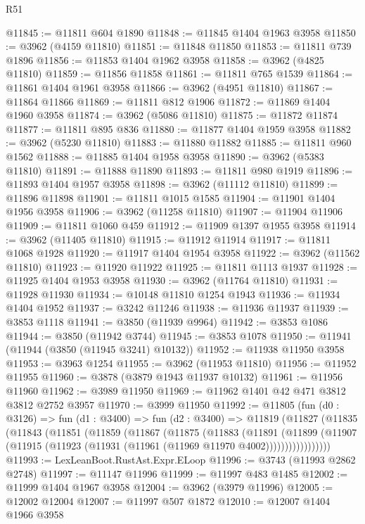 \begin{lexlean}{R51}
\begin{coremodule}
@11845 := @11811 @604 @1890
@11848 := @11845 @1404 @1963 @3958
@11850 := @3962 (@4159 @11810)
@11851 := @11848 @11850
@11853 := @11811 @739 @1896
@11856 := @11853 @1404 @1962 @3958
@11858 := @3962 (@4825 @11810)
@11859 := @11856 @11858
@11861 := @11811 @765 @1539
@11864 := @11861 @1404 @1961 @3958
@11866 := @3962 (@4951 @11810)
@11867 := @11864 @11866
@11869 := @11811 @812 @1906
@11872 := @11869 @1404 @1960 @3958
@11874 := @3962 (@5086 @11810)
@11875 := @11872 @11874
@11877 := @11811 @895 @836
@11880 := @11877 @1404 @1959 @3958
@11882 := @3962 (@5230 @11810)
@11883 := @11880 @11882
@11885 := @11811 @960 @1562
@11888 := @11885 @1404 @1958 @3958
@11890 := @3962 (@5383 @11810)
@11891 := @11888 @11890
@11893 := @11811 @980 @1919
@11896 := @11893 @1404 @1957 @3958
@11898 := @3962 (@11112 @11810)
@11899 := @11896 @11898
@11901 := @11811 @1015 @1585
@11904 := @11901 @1404 @1956 @3958
@11906 := @3962 (@11258 @11810)
@11907 := @11904 @11906
@11909 := @11811 @1060 @459
@11912 := @11909 @1397 @1955 @3958
@11914 := @3962 (@11405 @11810)
@11915 := @11912 @11914
@11917 := @11811 @1068 @1928
@11920 := @11917 @1404 @1954 @3958
@11922 := @3962 (@11562 @11810)
@11923 := @11920 @11922
@11925 := @11811 @1113 @1937
@11928 := @11925 @1404 @1953 @3958
@11930 := @3962 (@11764 @11810)
@11931 := @11928 @11930
@11934 := @10148 @11810 @1254 @1943
@11936 := @11934 @1404 @1952
@11937 := @3242 @11246
@11938 := @11936 @11937
@11939 := @3853 @1118
@11941 := @3850 (@11939 @9964)
@11942 := @3853 @1086
@11944 := @3850 (@11942 @3744)
@11945 := @3853 @1078
@11950 := @11941 (@11944 (@3850 (@11945 @3241) @10132))
@11952 := @11938 @11950 @3958
@11953 := @3963 @1254
@11955 := @3962 (@11953 @11810)
@11956 := @11952 @11955
@11960 := @3878 (@3879 @1943 @11937 @10132)
@11961 := @11956 @11960
@11962 := @3989 @11950
@11969 := @11962 @1401 @42 @471 @3812 @3812 @2752 @3957
@11970 := @3999 @11950
@11992 := @11805
    (fun (d0 : @3126) =>
    fun (d1 : @3400) =>
    fun (d2 : @3400) =>
    @11819
      (@11827
        (@11835
          (@11843
            (@11851
              (@11859
                (@11867
                  (@11875
                    (@11883
                      (@11891
                        (@11899
                          (@11907
                            (@11915 (@11923 (@11931 (@11961 (@11969 @11970 @4002)))))))))))))))))
@11993 := LexLeanBoot.RustAst.Expr.ELoop
@11996 := @3743 (@11993 @2862 @2748)
@11997 := @11147 @11996
@11999 := @11997 @483 @1485
@12002 := @11999 @1404 @1967 @3958
@12004 := @3962 (@3979 @11996)
@12005 := @12002 @12004
@12007 := @11997 @507 @1872
@12010 := @12007 @1404 @1966 @3958

\end{coremodule}
\end{lexlean}
